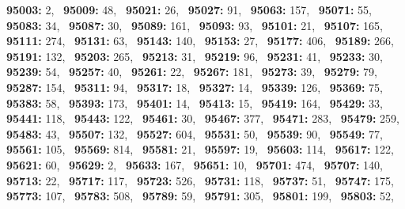 \textbf{95003:} 2,\allowbreak~ 
\textbf{95009:} 48,\allowbreak~ 
\textbf{95021:} 26,\allowbreak~ 
\textbf{95027:} 91,\allowbreak~ 
\textbf{95063:} 157,\allowbreak~ 
\textbf{95071:} 55,\allowbreak~ 
\textbf{95083:} 34,\allowbreak~ 
\textbf{95087:} 30,\allowbreak~ 
\textbf{95089:} 161,\allowbreak~ 
\textbf{95093:} 93,\allowbreak~ 
\textbf{95101:} 21,\allowbreak~ 
\textbf{95107:} 165,\allowbreak~ 
\textbf{95111:} 274,\allowbreak~ 
\textbf{95131:} 63,\allowbreak~ 
\textbf{95143:} 140,\allowbreak~ 
\textbf{95153:} 27,\allowbreak~ 
\textbf{95177:} 406,\allowbreak~ 
\textbf{95189:} 266,\allowbreak~ 
\textbf{95191:} 132,\allowbreak~ 
\textbf{95203:} 265,\allowbreak~ 
\textbf{95213:} 31,\allowbreak~ 
\textbf{95219:} 96,\allowbreak~ 
\textbf{95231:} 41,\allowbreak~ 
\textbf{95233:} 30,\allowbreak~ 
\textbf{95239:} 54,\allowbreak~ 
\textbf{95257:} 40,\allowbreak~ 
\textbf{95261:} 22,\allowbreak~ 
\textbf{95267:} 181,\allowbreak~ 
\textbf{95273:} 39,\allowbreak~ 
\textbf{95279:} 79,\allowbreak~ 
\textbf{95287:} 154,\allowbreak~ 
\textbf{95311:} 94,\allowbreak~ 
\textbf{95317:} 18,\allowbreak~ 
\textbf{95327:} 14,\allowbreak~ 
\textbf{95339:} 126,\allowbreak~ 
\textbf{95369:} 75,\allowbreak~ 
\textbf{95383:} 58,\allowbreak~ 
\textbf{95393:} 173,\allowbreak~ 
\textbf{95401:} 14,\allowbreak~ 
\textbf{95413:} 15,\allowbreak~ 
\textbf{95419:} 164,\allowbreak~ 
\textbf{95429:} 33,\allowbreak~ 
\textbf{95441:} 118,\allowbreak~ 
\textbf{95443:} 122,\allowbreak~ 
\textbf{95461:} 30,\allowbreak~ 
\textbf{95467:} 377,\allowbreak~ 
\textbf{95471:} 283,\allowbreak~ 
\textbf{95479:} 259,\allowbreak~ 
\textbf{95483:} 43,\allowbreak~ 
\textbf{95507:} 132,\allowbreak~ 
\textbf{95527:} 604,\allowbreak~ 
\textbf{95531:} 50,\allowbreak~ 
\textbf{95539:} 90,\allowbreak~ 
\textbf{95549:} 77,\allowbreak~ 
\textbf{95561:} 105,\allowbreak~ 
\textbf{95569:} 814,\allowbreak~ 
\textbf{95581:} 21,\allowbreak~ 
\textbf{95597:} 19,\allowbreak~ 
\textbf{95603:} 114,\allowbreak~ 
\textbf{95617:} 122,\allowbreak~ 
\textbf{95621:} 60,\allowbreak~ 
\textbf{95629:} 2,\allowbreak~ 
\textbf{95633:} 167,\allowbreak~ 
\textbf{95651:} 10,\allowbreak~ 
\textbf{95701:} 474,\allowbreak~ 
\textbf{95707:} 140,\allowbreak~ 
\textbf{95713:} 22,\allowbreak~ 
\textbf{95717:} 117,\allowbreak~ 
\textbf{95723:} 526,\allowbreak~ 
\textbf{95731:} 118,\allowbreak~ 
\textbf{95737:} 51,\allowbreak~ 
\textbf{95747:} 175,\allowbreak~ 
\textbf{95773:} 107,\allowbreak~ 
\textbf{95783:} 508,\allowbreak~ 
\textbf{95789:} 59,\allowbreak~ 
\textbf{95791:} 305,\allowbreak~ 
\textbf{95801:} 199,\allowbreak~ 
\textbf{95803:} 52,\allowbreak~ 

